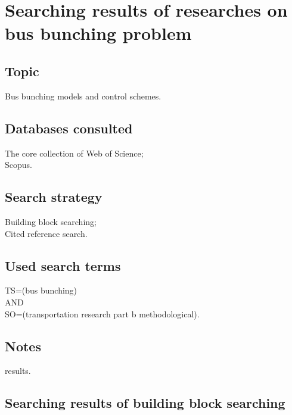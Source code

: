 \documentclass{article}
\begin{document}
\section{Searching results of researches on bus bunching problem}
\subsection*{Topic}
\noindent Bus bunching models and control schemes.

\subsection*{Databases consulted} 
\noindent The core collection of Web of Science;\\
Scopus.

\subsection*{Search strategy} 
\noindent Building block searching;\\
Cited reference search.

\subsection*{Used search terms}
\noindent TS=(bus bunching)\\
AND\\
SO=(transportation research part b methodological).

\subsection*{Notes}
 results.

\subsection*{Searching results of building block searching}
\end{document}
